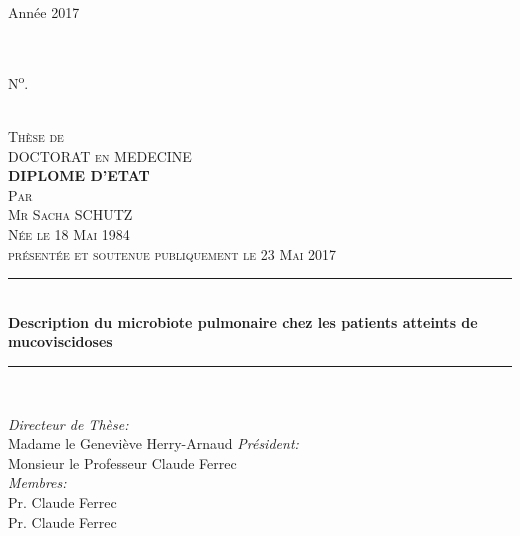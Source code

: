 \documentclass[12pt,a4paper]{article}
\newcommand{\HRule}{\rule{\linewidth}{0.5mm}} %
\begin{document}
\begin{titlepage}

\begin{minipage}{0.4\textwidth}
 \begin{flushleft} \large
     Année 2017
 \end{flushleft}
\end{minipage}
~
\begin{minipage}{0.5\textwidth}
 \begin{flushright} \large
    N\textsuperscript{o}.
 \end{flushright}
\end{minipage}\\[0.2cm]


\center
\textsc{\large Thèse de }\\[0.1cm]
\textsc{\large DOCTORAT en MEDECINE }\\[0.5cm]

\textsc{\Large \textbf{DIPLOME D'ETAT}}\\[0.5cm]
\textsc{\large Par}\\[0.1cm]
\textsc{\Large Mr Sacha SCHUTZ} \\[0.5cm]
\textsc{\normalsize Née le 18 Mai 1984} \\[0.5cm]
\textsc{\normalsize présentée et soutenue publiquement le 23 Mai 2017}\\[2.5cm]


\HRule \\[0.8cm]

{ \huge \bfseries Description du microbiote pulmonaire chez les patients atteints de mucoviscidoses}\\[0.4cm]

\HRule \\[3.2cm]

 \begin{flushleft} \large
      \emph{Directeur de Thèse:}\\
      Madame le Geneviève Herry-Arnaud
     \emph{Président:}\\
      Monsieur le Professeur Claude Ferrec\\
      \emph{Membres:} \\
      Pr. Claude Ferrec\\
     Pr. Claude Ferrec\\
\end{flushleft}


\vfill %

\end{titlepage}
\end{document}
